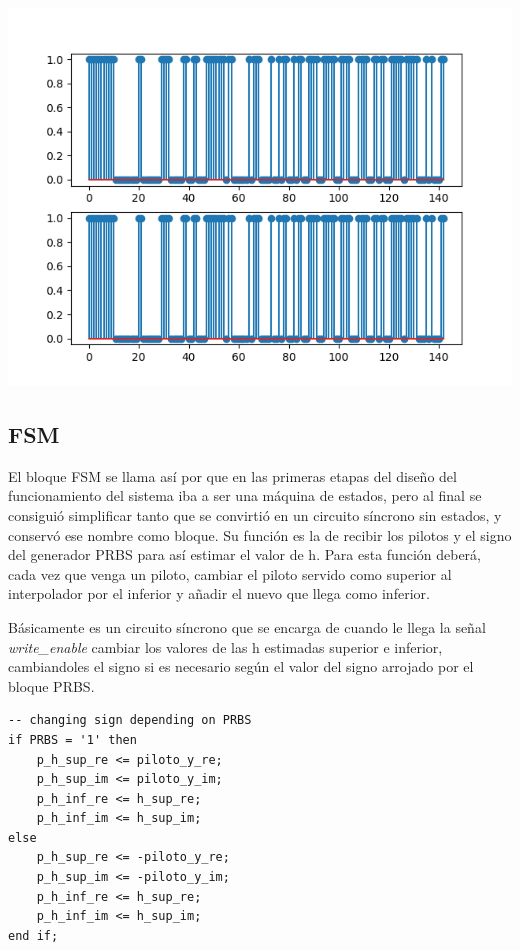 \documentclass[11pt]{scrartcl} %
\begin{document}
\begin{preview}
\begin{minipage}{\linewidth}
	\begin{center}
		\includegraphics[width=1\columnwidth,trim={0 0.5cm 1cm 1cm},clip]{../../Linux/P2/CoCoTb/pilotos.png} %
	\end{center}
	\label{pilotos}
\end{minipage}

\subsection{FSM}

El bloque FSM se llama así por que en las primeras etapas del diseño del funcionamiento del sistema iba a ser una máquina de estados, pero al final se consiguió simplificar tanto que se convirtió en un circuito síncrono sin estados, y conservó ese nombre como bloque. Su función es la de recibir los pilotos y el signo del generador PRBS para así estimar el valor de h. Para esta función deberá, cada vez que venga un piloto, cambiar el piloto servido como superior al interpolador por el inferior y añadir el nuevo que llega como inferior.

Básicamente es un circuito síncrono que se encarga de cuando le llega la señal \emph{write\_enable} cambiar los valores de las h estimadas superior e inferior, cambiandoles el signo si es necesario según el valor del signo arrojado por el bloque PRBS.

\begin{verbatim}
-- changing sign depending on PRBS
if PRBS = '1' then
	p_h_sup_re <= piloto_y_re;
	p_h_sup_im <= piloto_y_im;
	p_h_inf_re <= h_sup_re;
	p_h_inf_im <= h_sup_im;
else
	p_h_sup_re <= -piloto_y_re;
	p_h_sup_im <= -piloto_y_im;
	p_h_inf_re <= h_sup_re;
	p_h_inf_im <= h_sup_im;
end if;
\end{verbatim}


\end{preview}
\end{document}

